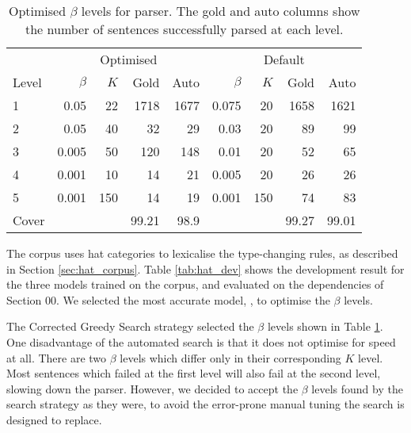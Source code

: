 \begin{table}
\centering
\begin{tabular}{l|rrrr|rrrr}
\hline
      & \multicolumn{4}{c|}{Optimised}& \multicolumn{4}{c}{Default} \\
Level & $\beta$ & $K$ & Gold & Auto   & $\beta$ & $K$  & Gold & Auto \\
\hline
\hline
1     & 0.05    & 22  & 1718 & 1677 & 0.075    & 20  & 1658   & 1621\\
2     & 0.05    & 40  & 32   &   29 & 0.03     & 20  & 89     & 99  \\
3     & 0.005   & 50  & 120  &  148 & 0.01     & 20  & 52     & 65  \\
4     & 0.001   & 10  & 14   &   21 & 0.005    & 20  & 26     & 26  \\
5     & 0.001   & 150 & 14   &   19 & 0.001    & 150 & 74     & 83  \\
\hline
Cover &         &     & 99.21& 98.9 &          &     & 99.27  & 99.01\\
\hline
\end{tabular}
 \caption[Optimised $\beta$ levels for \hatsys parser.]{Optimised $\beta$ levels
for \hatsys parser. The gold and auto columns show the number of sentences
successfully parsed at each level.\label{tab:hat_betas}}
\end{table}


The \hatsys corpus uses hat categories to lexicalise the \ccgbank
type-changing rules, as described in Section \ref{sec:hat_corpus}. Table
\ref{tab:hat_dev} shows the development result for the three models trained on
the \hatsys corpus, and evaluated on the \ccgbank dependencies of Section 00.
We selected the most accurate model, \hybrid, to optimise the $\beta$ levels.

The Corrected Greedy Search strategy selected the $\beta$ levels shown in Table
\ref{tab:hat_betas}. One disadvantage of the automated search is that it does
not optimise for speed at all. There are two $\beta$ levels which differ only in
their corresponding $K$ level. Most sentences which failed at the first level
will also fail at the second level, slowing down the parser. However, we decided
to accept the $\beta$ levels found by the search strategy as they were, to avoid
the error-prone manual tuning the search is designed to replace.
 

